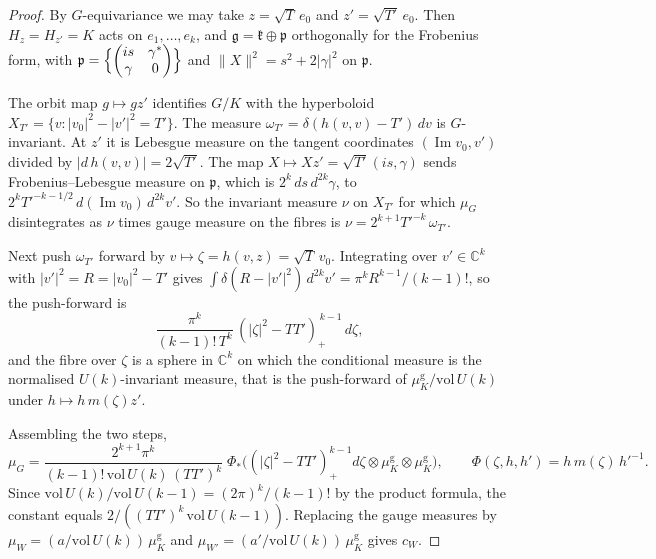 \documentclass[11pt]{article}
\theoremstyle{remark}
\begin{document}
\begin{proof}
By $G$-equivariance we may take $z=\sqrt T\,e_0$ and $z'=\sqrt{T'}\,e_0$. Then $H_z=H_{z'}=K$ acts on $e_1,\dots,e_k$, and $\mathfrak g=\mathfrak k\oplus\mathfrak p$ orthogonally for the Frobenius form, with $\mathfrak p=\Bigl\{\begin{pmatrix}is&\gamma^*\\\gamma&0\end{pmatrix}\Bigr\}$ and $\lVert X\rVert^2=s^2+2\lvert\gamma\rvert^2$ on $\mathfrak p$.

The orbit map $g\mapsto gz'$ identifies $G/K$ with the hyperboloid $X_{T'}=\{v:\lvert v_0\rvert^2-\lvert v'\rvert^2=T'\}$. The measure $\omega_{T'}=\delta(h(v,v)-T')\,dv$ is $G$-invariant. At $z'$ it is Lebesgue measure on the tangent coordinates $(\operatorname{Im}v_0,v')$ divided by $\lvert d\,h(v,v)\rvert=2\sqrt{T'}$. The map $X\mapsto Xz'=\sqrt{T'}(is,\gamma)$ sends Frobenius--Lebesgue measure on $\mathfrak p$, which is $2^k\,ds\,d^{2k}\gamma$, to $2^kT'^{-k-1/2}\,d(\operatorname{Im}v_0)\,d^{2k}v'$. So the invariant measure $\nu$ on $X_{T'}$ for which $\mu_G$ disintegrates as $\nu$ times gauge measure on the fibres is $\nu=2^{k+1}T'^{-k}\,\omega_{T'}$.

Next push $\omega_{T'}$ forward by $v\mapsto\zeta=h(v,z)=\sqrt T\,v_0$. Integrating over $v'\in\mathbb C^k$ with $\lvert v'\rvert^2=R=\lvert v_0\rvert^2-T'$ gives $\int\delta(R-\lvert v'\rvert^2)\,d^{2k}v'=\pi^kR^{k-1}/(k-1)!$, so the push-forward is
\[
\frac{\pi^k}{(k-1)!\,T^k}\,(\lvert\zeta\rvert^2-TT')_+^{\,k-1}\,d\zeta,
\]
and the fibre over $\zeta$ is a sphere in $\mathbb C^k$ on which the conditional measure is the normalised $U(k)$-invariant measure, that is the push-forward of $\mu_K^{\mathrm g}/\mathrm{vol}\,U(k)$ under $h\mapsto h\,m(\zeta)z'$.

Assembling the two steps,
\[
\mu_G=\frac{2^{k+1}\pi^k}{(k-1)!\,\mathrm{vol}\,U(k)\,(TT')^k}\;\Phi_*\bigl((\lvert\zeta\rvert^2-TT')_+^{k-1}d\zeta\otimes\mu_K^{\mathrm g}\otimes\mu_K^{\mathrm g}\bigr),\qquad\Phi(\zeta,h,h')=h\,m(\zeta)\,h'^{-1}.
\]
Since $\mathrm{vol}\,U(k)/\mathrm{vol}\,U(k-1)=(2\pi)^k/(k-1)!$ by the product formula, the constant equals $2/((TT')^k\,\mathrm{vol}\,U(k-1))$. Replacing the gauge measures by $\mu_W=(a/\mathrm{vol}\,U(k))\,\mu_K^{\mathrm g}$ and $\mu_{W'}=(a'/\mathrm{vol}\,U(k))\,\mu_K^{\mathrm g}$ gives $c_W$.
\end{proof}
\end{document}
